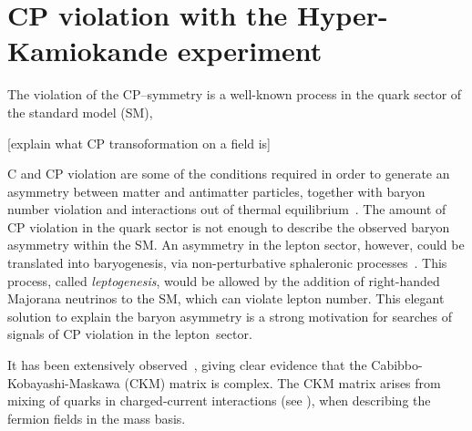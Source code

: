 \clearpage
\chapter{CP violation with the Hyper-Kamiokande experiment}
\label{cha:cp_hk}

The violation of the CP--symmetry is a well-known process in the quark sector of the standard model (SM),

[explain what CP transoformation on a field is]

C and CP violation are some of the conditions required in order to generate %
an asymmetry between matter and antimatter particles, together with %
baryon number violation and interactions out of thermal equilibrium~\cite{Sakharov:1967dj}.
The amount of CP violation in the quark sector is not enough %
to describe the observed baryon asymmetry within the SM.
An asymmetry in the lepton sector, however, could be translated into baryogenesis, %
via non-perturbative sphaleronic processes~\cite{Fukugita:1986hr}.
This process, called \emph{leptogenesis}, would be allowed by the addition of %
right-handed Majorana neutrinos to the SM, which can violate lepton number.
This elegant solution to explain the baryon asymmetry is a strong motivation %
for searches of signals of CP violation in the lepton~sector.


It has been extensively observed~\cite{Christenson:1964fg,Aubert:2001sp, Abe:2001xe, Aaij:2013iua, Aaij:2019kcg}, %
giving clear evidence that the Cabibbo-Kobayashi-Maskawa (CKM) matrix is complex.
The CKM matrix arises from mixing of quarks in charged-current interactions (see ), %
when describing the fermion fields in the mass basis.

